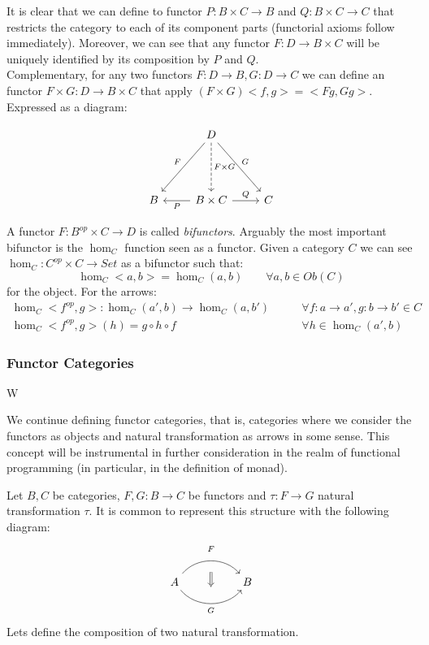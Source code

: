 It is clear that we can define to functor $P: B\times C \to B$ and $Q: B \times C \to C$ that restricts the category to each of its component parts (functorial axioms follow immediately). Moreover, we can see that any functor $F:D\to B\times C$ will be uniquely identified by its composition by $P$ and $Q$.\\

Complementary, for any two functors $F:D\to B, G:D\to C$ we can define an functor $F \times G : D \to B\times C$ that apply $(F\times G) <f,g> = <Fg, Gg>$. Expressed as a diagram: 

\[
\begin{tikzcd}
  {} & D
  \arrow[swap, "F"]{ddl}
  \arrow[dashed, "F\times G"]{dd}
  \arrow["G"]{ddr}\\
  {} & \\
  B & B \times C
  \arrow["P"]{l}
  \arrow["Q"]{r} & C
\end{tikzcd}
\]

A functor $F: B^{op}\times C \to D$ is called \emph{bifunctors}. Arguably the most important bifunctor is the $\hom_C$ function seen as a functor. Given a category $C$ we can see $\hom_C: C^{op}\times C \to Set$ as a bifunctor such that:
\[
  \hom_C<a,b> = \hom_C (a,b) \qquad \forall a,b \in Ob(C)
\]
for the object. For the arrows:
\begin{align*}
  \hom_C<f^{op},g>: \hom_C (a',b)  \to \hom_C(a,b') &\qquad  \forall f:a\to a', g:b\to b' \in C\\
  \hom_C<f^{op},g> (h)   = g \circ h \circ f  &\qquad \forall  h\in \hom_C(a',b) 
\end{align*}
\subsubsection{Functor Categories}
W

We continue defining functor categories, that is, categories where we consider the functors as objects and natural transformation as arrows in some sense. This concept will be instrumental in further consideration in the realm of functional programming (in particular, in the definition of monad).

Let $B,C$ be categories, $F,G:B\to C$ be functors and $\tau:F\to G$ natural transformation $\tau$. It is common to represent this structure with the following diagram:
\[
\begin{tikzcd}[column sep=huge]
A
  \arrow[bend left=50]{r}[name=F,label=above:$\scriptstyle F$]{}
  \arrow[bend right=50]{r}[name=G,label=below:$\scriptstyle G$]{} &
B
  \arrow[shorten <=10pt,shorten >=10pt,Rightarrow,to path={(F) -- node {} (G)}]{}
\end{tikzcd}
\]
Lets define the composition of two natural transformation.

